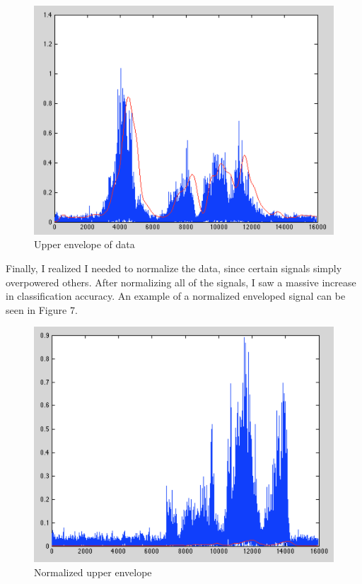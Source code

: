 \documentclass[12pt]{article}
\begin{document}
\begin{figure}[h!]
\centering
\includegraphics[scale=0.7]{enveloped.png}
\caption{Upper envelope of data}
\end{figure}
\FloatBarrier

Finally, I realized I needed to normalize the data, since certain signals simply overpowered others. After normalizing all of the signals, I saw a massive increase in classification accuracy. An example of a normalized enveloped signal can be seen in Figure 7.

\begin{figure}[h!]
\centering
\includegraphics[scale=0.7]{normalized.png}
\caption{Normalized upper envelope}
\end{figure}
\end{document}
